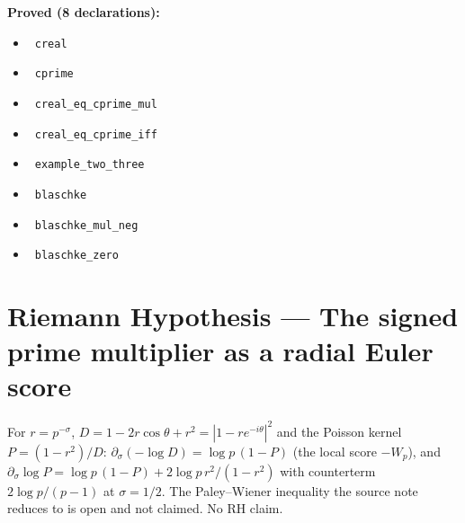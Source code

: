 \documentclass{report}
\theoremstyle{definition}
\begin{document}
\noindent\textbf{Proved (8 declarations):}
\begin{itemize}
  \item {}\leanok\ \texttt{creal}
  \item {}\leanok\ \texttt{cprime}
  \item {}\leanok\ \texttt{creal\_eq\_cprime\_mul}
  \item {}\leanok\ \texttt{creal\_eq\_cprime\_iff}
  \item {}\leanok\ \texttt{example\_two\_three}
  \item {}\leanok\ \texttt{blaschke}
  \item {}\leanok\ \texttt{blaschke\_mul\_neg}
  \item {}\leanok\ \texttt{blaschke\_zero}
\end{itemize}

\section{Riemann Hypothesis --- The signed prime multiplier as a radial Euler score}
For $r=p^{-\sigma}$, $D=1-2r\cos\theta+r^2=|1-re^{-i\theta}|^2$ and the Poisson kernel $P=(1-r^2)/D$: $\partial_\sigma(-\log D)=\log p\,(1-P)$ (the local score $-W_p$), and $\partial_\sigma\log P=\log p\,(1-P)+2\log p\,r^2/(1-r^2)$ with counterterm $2\log p/(p-1)$ at $\sigma=1/2$. The Paley--Wiener inequality the source note reduces to is open and not claimed. No RH claim.
\end{document}
